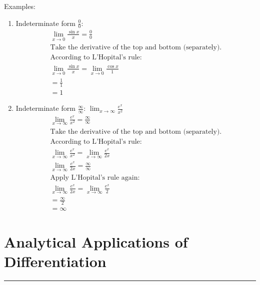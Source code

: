 \documentclass[12pt]{article}
\begin{document}
            \noindent Examples:
            \begin{enumerate}
                \item Indeterminate form $\frac{0}{0}$:
                \begin{gather*}
                    \lim_{x \to 0} \frac{\sin{x}}{x} = \frac{0}{0} \\[6pt]
                    \text{Take the derivative of the top and bottom (separately).}\\
                    \text{According to L'Hopital's rule:} \\
                    \lim_{x \to 0} \frac{\sin{x}}{x} = \lim_{x \to 0} \frac{\cos{x}}{1} \\[6pt]
                    = \frac{1}{1} \\[6pt]
                    = 1
                \end{gather*}

                \item Indeterminate form $\frac{\infty}{\infty}$: $\lim_{x \to \infty} \frac{e^x}{x^2}$
                \begin{gather*}
                    \lim_{x \to \infty} \frac{e^x}{x^2} = \frac{\infty}{\infty} \\[6pt]
                    \text{Take the derivative of the top and bottom (separately).}\\
                    \text{According to L'Hopital's rule:} \\
                    \lim_{x \to \infty} \frac{e^x}{x^2} = \lim_{x \to \infty} \frac{e^x}{2x} \\[6pt]
                    \lim_{x \to \infty} \frac{e^x}{2x} = \frac{\infty}{\infty} \\[6pt]
                    \text{Apply L'Hopital's rule again:} \\
                    \lim_{x \to \infty} \frac{e^x}{2x} = \lim_{x \to \infty} \frac{e^x}{2} \\[6pt]
                    = \frac{\infty}{2} \\[6pt]
                    = \infty
                \end{gather*}
            \end{enumerate}

    \section{Analytical Applications of Differentiation}
    \par\noindent\rule{\textwidth}{0.1pt}
\end{document}

